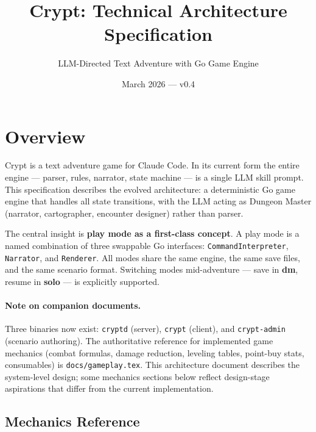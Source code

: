 \documentclass[a4paper,10pt]{article}
\newcommand{\iface}[1]{\texttt{#1}}
\newcommand{\cmd}[1]{\texttt{#1}}
\newcommand{\mode}[1]{\textbf{#1}}
\begin{document}
\title{Crypt: Technical Architecture Specification}
\author{LLM-Directed Text Adventure with Go Game Engine}
\date{March 2026 --- v0.4}
\maketitle

\tableofcontents
\newpage

\section{Overview}

Crypt is a text adventure game for Claude Code.  In its current
form the entire engine --- parser, rules, narrator, state machine ---
is a single LLM skill prompt.  This specification describes the
evolved architecture: a deterministic Go game engine that handles
all state transitions, with the LLM acting as Dungeon Master
(narrator, cartographer, encounter designer) rather than parser.

The central insight is \textbf{play mode as a first-class concept}.
A play mode is a named combination of three swappable Go interfaces:
\iface{CommandInterpreter}, \iface{Narrator}, and \iface{Renderer}.
All modes share the same engine, the same save files, and the same
scenario format.  Switching modes mid-adventure --- save in
\mode{dm}, resume in \mode{solo} --- is explicitly supported.

\paragraph{Note on companion documents.}
Three binaries now exist: \cmd{cryptd} (server), \cmd{crypt} (client),
and \cmd{crypt-admin} (scenario authoring).  The authoritative reference
for implemented game mechanics (combat formulas, damage reduction, leveling
tables, point-buy stats, consumables) is \texttt{docs/gameplay.tex}.
This architecture document describes the system-level design; some
mechanics sections below reflect design-stage aspirations that differ
from the current implementation.

\subsection{Mechanics Reference}
\end{document}
